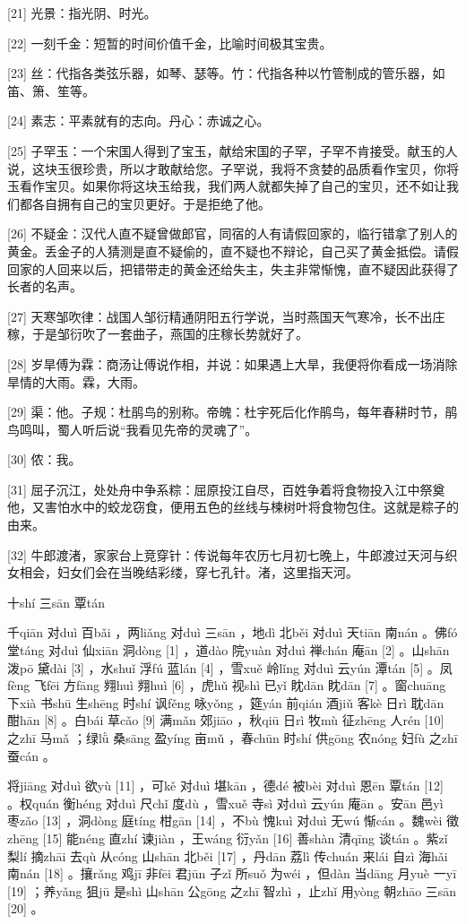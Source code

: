 \documentclass[12pt,UTF8]{ctexbook}
\begin{document}
[21] 光景：指光阴、时光。

[22] 一刻千金：短暂的时间价值千金，比喻时间极其宝贵。

[23] 丝：代指各类弦乐器，如琴、瑟等。竹：代指各种以竹管制成的管乐器，如笛、箫、笙等。

[24] 素志：平素就有的志向。丹心：赤诚之心。

[25] 子罕玉：一个宋国人得到了宝玉，献给宋国的子罕，子罕不肯接受。献玉的人说，这块玉很珍贵，所以才敢献给您。子罕说，我将不贪婪的品质看作宝贝，你将玉看作宝贝。如果你将这块玉给我，我们两人就都失掉了自己的宝贝，还不如让我们都各自拥有自己的宝贝更好。于是拒绝了他。

[26] 不疑金：汉代人直不疑曾做郎官，同宿的人有请假回家的，临行错拿了别人的黄金。丢金子的人猜测是直不疑偷的，直不疑也不辩论，自己买了黄金抵偿。请假回家的人回来以后，把错带走的黄金还给失主，失主非常惭愧，直不疑因此获得了长者的名声。

[27] 天寒邹吹律：战国人邹衍精通阴阳五行学说，当时燕国天气寒冷，长不出庄稼，于是邹衍吹了一套曲子，燕国的庄稼长势就好了。

[28] 岁旱傅为霖：商汤让傅说作相，并说：如果遇上大旱，我便将你看成一场消除旱情的大雨。霖，大雨。

[29] 渠：他。子规：杜鹃鸟的别称。帝魄：杜宇死后化作鹃鸟，每年春耕时节，鹃鸟鸣叫，蜀人听后说“我看见先帝的灵魂了”。

[30] 侬：我。

[31] 屈子沉江，处处舟中争系粽：屈原投江自尽，百姓争着将食物投入江中祭奠他，又害怕水中的蛟龙窃食，便用五色的丝线与楝树叶将食物包住。这就是粽子的由来。

[32] 牛郎渡渚，家家台上竞穿针：传说每年农历七月初七晚上，牛郎渡过天河与织女相会，妇女们会在当晚结彩缕，穿七孔针。渚，这里指天河。





十shí 三sān 覃tán


千qiān 对duì 百bǎi ，两liǎng 对duì 三sān ，地dì 北běi 对duì 天tiān 南nán 。佛fó 堂táng 对duì 仙xiān 洞dòng [1] ，道dào 院yuàn 对duì 禅chán 庵ān [2] 。山shān 泼pō 黛dài [3] ，水shuǐ 浮fú 蓝lán [4] ，雪xuě 岭lǐng 对duì 云yún 潭tán [5] 。凤fèng 飞fēi 方fāng 翙huì 翙huì [6] ，虎hǔ 视shì 已yǐ 眈dān 眈dān [7] 。窗chuāng 下xià 书shū 生shēng 时shí 讽fěng 咏yǒng ，筵yán 前qián 酒jiǔ 客kè 日rì 耽dān 酣hān [8] 。白bái 草cǎo [9] 满mǎn 郊jiāo ，秋qiū 日rì 牧mù 征zhēng 人rén [10] 之zhī 马mǎ ；绿lǜ 桑sāng 盈yíng 亩mǔ ，春chūn 时shí 供gōng 农nóng 妇fù 之zhī 蚕cán 。

将jiāng 对duì 欲yù [11] ，可kě 对duì 堪kān ，德dé 被bèi 对duì 恩ēn 覃tán [12] 。权quán 衡héng 对duì 尺chǐ 度dù ，雪xuě 寺sì 对duì 云yún 庵ān 。安ān 邑yì 枣zǎo [13] ，洞dòng 庭tíng 柑gān [14] ，不bù 愧kuì 对duì 无wú 惭cán 。魏wèi 徵zhēng [15] 能néng 直zhí 谏jiàn ，王wáng 衍yǎn [16] 善shàn 清qīng 谈tán 。紫zǐ 梨lí 摘zhāi 去qù 从cóng 山shān 北běi [17] ，丹dān 荔lì 传chuán 来lái 自zì 海hǎi 南nán [18] 。攘rǎng 鸡jī 非fēi 君jūn 子zǐ 所suǒ 为wéi ，但dàn 当dāng 月yuè 一yī [19] ；养yǎng 狙jū 是shì 山shān 公gōng 之zhī 智zhì ，止zhǐ 用yòng 朝zhāo 三sān [20] 。
\end{document}
